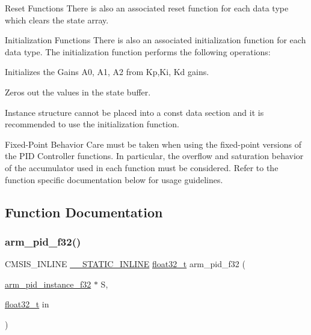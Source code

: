 \begin{DoxyParagraph}{Reset Functions}
There is also an associated reset function for each data type which clears the state array.
\end{DoxyParagraph}
\begin{DoxyParagraph}{Initialization Functions}
There is also an associated initialization function for each data type. The initialization function performs the following operations\+:
\begin{DoxyItemize}
\item Initializes the Gains A0, A1, A2 from Kp,Ki, Kd gains.
\item Zeros out the values in the state buffer.
\end{DoxyItemize}
\end{DoxyParagraph}
\begin{DoxyParagraph}{}
Instance structure cannot be placed into a const data section and it is recommended to use the initialization function.
\end{DoxyParagraph}
\begin{DoxyParagraph}{Fixed-\/\+Point Behavior}
Care must be taken when using the fixed-\/point versions of the P\+ID Controller functions. In particular, the overflow and saturation behavior of the accumulator used in each function must be considered. Refer to the function specific documentation below for usage guidelines. 
\end{DoxyParagraph}


\subsection{Function Documentation}
\mbox{\label{group___p_i_d_ga9380d08046dd7ec2f5015f569206b9ce}} 
\subsubsection{\texorpdfstring{arm\+\_\+pid\+\_\+f32()}{arm\_pid\_f32()}}
{\footnotesize\ttfamily C\+M\+S\+I\+S\+\_\+\+I\+N\+L\+I\+NE \mbox{\hyperlink{cmsis__iccarm_8h_aba87361bfad2ae52cfe2f40c1a1dbf9c}{\+\_\+\+\_\+\+S\+T\+A\+T\+I\+C\+\_\+\+I\+N\+L\+I\+NE}} \mbox{\hyperlink{arm__math_8h_a4611b605e45ab401f02cab15c5e38715}{float32\+\_\+t}} arm\+\_\+pid\+\_\+f32 (\begin{DoxyParamCaption}\item[{\mbox{\hyperlink{structarm__pid__instance__f32}{arm\+\_\+pid\+\_\+instance\+\_\+f32}} $\ast$}]{S,  }\item[{\mbox{\hyperlink{arm__math_8h_a4611b605e45ab401f02cab15c5e38715}{float32\+\_\+t}}}]{in }\end{DoxyParamCaption})}



